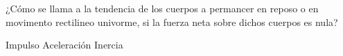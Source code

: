 
\question ¿Cómo se llama a la tendencia de los cuerpos a permancer en reposo
o en movimento rectilineo univorme, si la fuerza neta sobre dichos cuerpos
es nula?

  \begin{oneparchoices}
    \choice Impulso
    \choice Aceleración
    \choice Inercia
  \end{oneparchoices}
